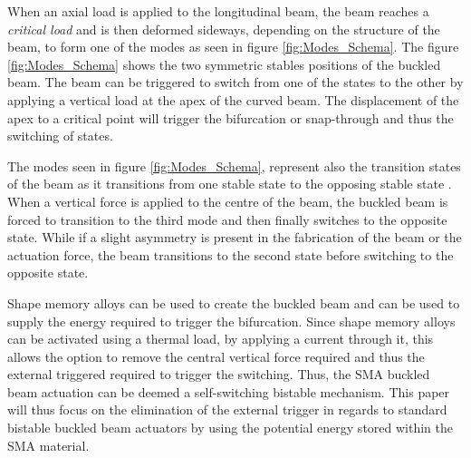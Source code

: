 When an axial load is applied to the longitudinal beam, the beam reaches a \emph{critical load} and is then deformed sideways, depending on the structure of the beam, to form one of the modes as seen in figure \ref{fig:Modes_Schema}.
The figure \ref{fig:Modes_Schema} shows the two symmetric stables positions of the buckled beam. The beam can be triggered to switch from one of the states to the other by applying a vertical load at the apex of the curved beam. The displacement of the apex to a critical point will trigger the bifurcation or snap-through and thus the switching of states.

The modes seen in figure \ref{fig:Modes_Schema}, represent also the transition states of the beam as it transitions from one stable state to the opposing stable state \cite{rossiter_self-switching_2006}. When a vertical force is applied to the centre of the beam, the buckled beam is forced to transition to the third mode and then finally switches to the opposite state. While if a slight asymmetry is present in the fabrication of the beam or the actuation force, the beam transitions to the second state before switching to the opposite state.

Shape memory alloys can be used to create the buckled beam and can be used to supply the energy required to trigger the bifurcation. Since shape memory alloys can be activated using a thermal load, by applying a current through it, this allows the option to remove the central vertical force required and thus the external triggered required to trigger the switching. Thus, the SMA buckled beam actuation can be deemed a self-switching bistable mechanism. This paper will thus focus on the elimination of the external trigger in regards to standard bistable buckled beam actuators by using the potential energy stored within the SMA material.

